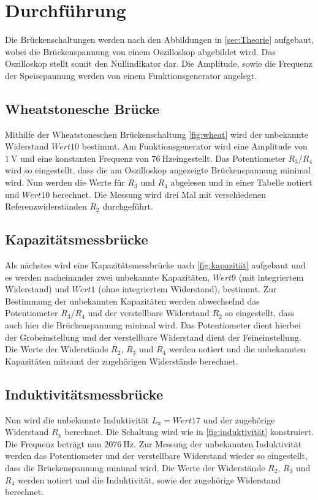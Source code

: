 \section{Durchführung}
\label{sec:Durchführung}

Die Brückenschaltungen werden nach den Abbildungen in \autoref{sec:Theorie} aufgebaut, wobei die Brückenspannung von einem Oszilloskop abgebildet wird.
Das Oszilloskop stellt somit den Nullindikator dar. Die Amplitude, sowie die Frequenz der Speisepannung werden von einem Funktionsgenerator angelegt.

\subsection{Wheatstonesche Brücke}
\label{subsec:wheatstone_durch}
Mithilfe der Wheatstoneschen Brückenschaltung \autoref{fig:wheat} wird der unbekannte Widerstand $Wert 10$ bestimmt.
Am Funktionsgenerator wird eine Amplitude von $\qty{1}{\volt}$ und eine konstanten Frequenz von $\qty{76}{\hertz}$eingestellt.
Das Potentiometer $R_3/R_4$ wird so eingestellt, dass die am Oszilloskop angezeigte Brückenspannung
minimal wird. Nun werden die Werte für $R_3$ und $R_4$ abgelesen und in einer Tabelle notiert und $Wert 10$ berechnet.
Die Messung wird drei Mal mit verschiedenen Referenzwiderständen $R_2$ durchgeführt.

\subsection{Kapazitätsmessbrücke}
\label{subsec:kapazitäts_durch}
Als nächstes wird eine Kapazitätsmessbrücke nach \autoref{fig:kapazität} aufgebaut und es werden nacheinander zwei unbekannte Kapazitäten, $Wert 9$ (mit integriertem Widerstand) und $Wert 1$ (ohne integriertem Widerstand),
bestimmt. Zur Bestimmung der unbekannten Kapazitäten werden abwechselnd das Potentiometer $R_3/R_4$ und der verstellbare Widerstand $R_2$ so eingestellt,
dass auch hier die Brückenspannung minimal wird. Das Potentiometer dient hierbei der Grobeinstellung und der verstellbare Widerstand dient der Feineinstellung.
Die Werte der Widerstände $R_2$, $R_3$ und $R_4$ werden notiert und die unbekannten Kapazitäten mitsamt der zugehörigen Widerstände berechnet.

\subsection{Induktivitätsmessbrücke}
\label{subsec:induktivität_durch}
Nun wird die unbekannte Induktivität $L_{\text{x}}=Wert 17$ und der zugehörige Widerstand $R_{\text{x}}$ berechnet. Die Schaltung wird wie in \autoref{fig:induktivität} konstruiert.
Die Frequenz beträgt nun $\qty{2076}{\hertz}$.
Zur Messung der unbekannten Induktivität werden das Potentiometer und der verstellbare Widerstand wieder so eingestellt, dass die Brückenspannung minimal wird.
Die Werte der Widerstände $R_2$, $R_3$ und $R_4$ werden notiert und die Induktivität, sowie der zugehörige Widerstand berechnet.

